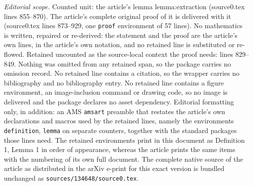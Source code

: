 \documentclass[10pt,a4paper]{amsart}
\begin{document}
\noindent\textit{Editorial scope.} Counted unit: the article's lemma lemma:extraction (source0.tex lines 855--870). The article's complete original proof of it is delivered with it (source0.tex lines 873--929, one \texttt{proof} environment of 57 lines). No mathematics is written, repaired or re-derived: the statement and the proof are the article's own lines, in the article's own notation, and no retained line is substituted or re-flowed.  Retained uncounted as the source-local context the proof needs: lines 829--849.  Nothing was omitted from any retained span, so the package carries no omission record.  No retained line contains a citation, so the wrapper carries no bibliography and no bibliography entry.  No retained line contains a figure environment, an image-inclusion command or drawing code, so no image is delivered and the package declares no asset dependency.  Editorial formatting only, in addition: an AMS \texttt{amsart} preamble that restates the article's own declarations and macros used by the retained lines, namely the environments \texttt{definition}, \texttt{lemma} on separate counters, together with the standard packages those lines need.  The retained environments print in this document as Definition 1, Lemma 1 in order of appearance, whereas the article prints the same items with the numbering of its own full document.  The complete native source of the article as distributed in the arXiv e-print for this exact version is bundled unchanged as \texttt{sources/134648/source0.tex}.
\end{document}
